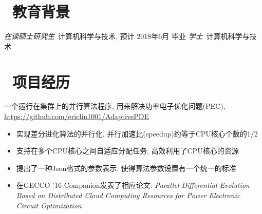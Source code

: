 \documentclass{resume}
\newcommand\quelle[1]{{%
		\unskip\nobreak\hfil\penalty50
		\hskip2em\hbox{}\nobreak\hfil #1%
\parfillskip=0pt \finalhyphendemerits=0 \par}}
\begin{document}


\basicInfo{
	\email{ericlin1001@qq.com} \textperiodcentered\ 
	\phone{(+86) 135-8053-2764} 
}

\section{\faGraduationCap\ 教育背景}
\textit{在读硕士研究生}\  计算机科学与技术, 预计 2018年6月 毕业
\textit{学士}\ 计算机科学与技术 


\section{\faUsers\ 项目经历}
一个运行在集群上的并行算法程序, 用来解决功率电子优化问题(PEC), \url{https://github.com/ericlin1001/AdaptivePDE}
\begin{itemize}
	\item 实现差分进化算法的并行化, 并行加速比(speedup)约等于CPU核心个数的1/2
	\item 支持在多个CPU核心之间自适应分配任务, 高效利用了CPU核心的资源
	\item 提出了一种Json格式的参数表示, 使得算法参数设置有一个统一的标准
	\item 在GECCO '16 Companion发表了相应论文: \textit{Parallel Differential Evolution Based on Distributed Cloud Computing Resources for Power Electronic Circuit Optimization} %
\end{itemize}
\end{document}
